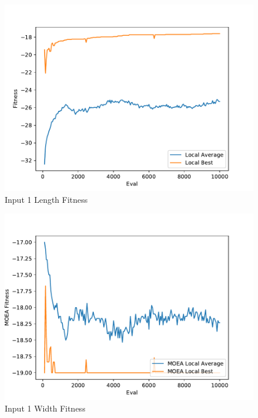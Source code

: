 \documentclass{standalone}
\begin{document}
\begin{figure}[!htb]
	\caption{Input 1 Length Fitness}
	\label{fig:graph_1001}
	\includegraphics[width=\textwidth]{../graphs/graphs/1001.pdf}
\end{figure}


\begin{figure}[!htb]
	\caption{Input 1 Width Fitness}
	\label{fig:graph_1001_moea}
	\includegraphics[width=\textwidth]{../graphs/graphs/1001_moea.pdf}
\end{figure}
\end{document}

